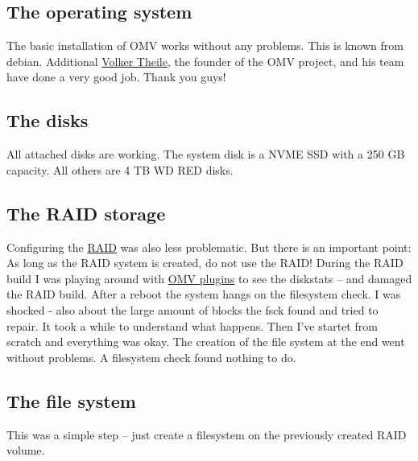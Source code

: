 \subsection{The operating system}

The basic installation of \gls{OMV} works without any problems. This is known
from debian. Additional \href{https://www.openmediavault.org/?page_id=1206}{Volker Theile},
the founder of the \gls{OMV} project, and his team have done a very good job.
Thank you guys!


\subsection{The disks}

All attached disks are working. The system disk is a NVME SSD with a 250 GB
capacity. All others are 4 TB WD RED disks.


\subsection{The RAID storage}

Configuring the \href{https://en.wikipedia.org/wiki/RAID}{RAID} was also less
problematic. But there is an important point: As long as the RAID system is
created, do not use the RAID! During the RAID build I was playing around with
\href{https://www.openmediavault.org/?page_id=2014}{OMV plugins} to see the
diskstats -- and damaged the RAID build. After a reboot the system hangs on
the filesystem check. I was shocked - also about the large amount of blocks
the fsck found and tried to repair. It took a while to understand what happens.
Then I've startet from scratch and everything was okay. The creation of the
file system at the end went without problems. A filesystem check found nothing
to do.


\subsection{The file system}

This was a simple step -- just create a filesystem on the previously created
RAID volume.


